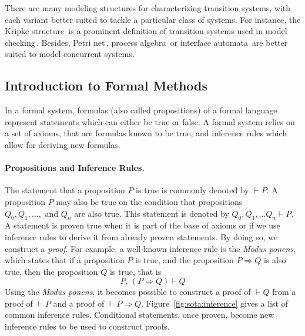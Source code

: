 There are many modeling structures for characterizing transition systems, with
each variant better suited to tackle a particular class of systems.
%
For instance, the Kripke structure\,\cite{kripke1971semantical} is a prominent
definition of transition systems used in model checking\,\cite{clarke1999model}.
%
Besides, Petri net\,\cite{peterson1981petri}, process
algebra\,\cite{bergstra1984process} or interface
automata\,\cite{de2001interface} are better suited to model concurrent systems.

\subsection{Introduction to Formal Methods}
\label{subsec:sota:fm}

In a formal system, formulas (also called propositions) of a formal language
represent statements which can either be true or false.
%
A formal system relies on a set of axioms, that are formulas known to be true,
and inference rules which allow for deriving new formulas.

\paragraph{Propositions and Inference Rules.}
%
The statement that a proposition \( P \) is true is commonly denoted by
\( \vdash P \).
%
A proposition \( P \) may also be true on the condition that propositions
\( Q_0, Q_1, ..., \text{ and } Q_n \) are also true.
%
This statement is denoted by \( Q_0, Q_1, ... Q_n \vdash P \).
%
A statement is proven true when it is part of the base of axioms or if we use
inference rules to derive it from already proven statements.
%
By doing so, we construct a \emph{proof}.
%
For example, a well-known inference rule is the \emph{Modus ponens}, which
states that if a proposition \( P \) is true, and the proposition
\( P \Rightarrow Q \) is also true, then the proposition \( Q \) is true, that
is
%
\[
  P\text{, }(P \Rightarrow Q) \vdash Q
\]
%
Using the \emph{Modus ponens}, it becomes possible to construct a proof of
\( \vdash Q \) from a proof of \( \vdash P \) and a proof of
\( \vdash P \Rightarrow Q \).
%
Figure~\ref{fig:sota:inference} gives a list of common inference rules.
%
Conditional statements, once proven, become new inference rules to be used to
construct proofs.

